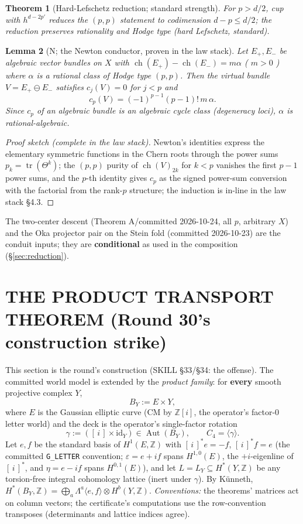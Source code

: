 \documentclass[11pt]{article}
\newcommand{\ch}{\operatorname{ch}}
\newcommand{\tr}{\operatorname{tr}}
\newcommand{\Z}{\mathbb Z}
\newtheorem{theorem}{Theorem}[section]
\newtheorem{lemma}[theorem]{Lemma}
\begin{document}
\begin{theorem}[Hard-Lefschetz reduction; standard strength]
For $p>d/2$, cup with $h^{d-2p'}$ reduces the $(p,p)$ statement to
codimension $d-p\le d/2$; the reduction preserves rationality and Hodge
type (hard Lefschetz, standard).
\end{theorem}

\begin{lemma}[N; the Newton conductor, proven in the law stack]\label{lem:N}
Let $E_+,E_-$ be algebraic vector bundles on $X$ with
$\ch(E_+)-\ch(E_-)=m\alpha$ ( $m>0$ ) where $\alpha$ is a rational class of
Hodge type $(p,p)$. Then the virtual bundle $V=E_+\ominus E_-$ satisfies
$c_j(V)=0$ for $j<p$ and
\[
c_p(V)=(-1)^{p-1}(p-1)!\,m\,\alpha .
\]
Since $c_p$ of an algebraic bundle is an algebraic cycle class
(degeneracy loci), $\alpha$ is rational-algebraic.
\end{lemma}

\begin{proof}[Proof sketch (complete in the law stack)]
Newton's identities express the elementary symmetric functions in the
Chern roots through the power sums $p_k=\tr(\Theta^k)$; the $(p,p)$ purity
of $\ch(V)_{2k}$ for $k<p$ vanishes the first $p-1$ power sums, and the
$p$-th identity gives $c_p$ as the signed power-sum conversion with the
factorial from the rank-$p$ structure; the induction is in-line in the law
stack \S4.3.
\end{proof}

The two-center descent (Theorem A/committed 2026-10-24, all $p$, arbitrary
$X$) and the Oka projector pair on the Stein fold (committed 2026-10-23)
are the conduit inputs; they are \textbf{conditional} as used in the
composition (\S\ref{sec:reduction}).

\section{THE PRODUCT TRANSPORT THEOREM (Round 30's construction strike)}
\label{sec:transport}

This section is the round's construction (SKILL §33/§34: the offense). The
committed world model is extended by the \emph{product family}: for
\textbf{every} smooth projective complex $Y$,
\[
B_Y:=E\times Y,
\]
where $E$ is the Gaussian elliptic curve (CM by $\Z[i]$, the operator's
factor-0 letter world) and the deck is the operator's single-factor
rotation
\[
\gamma:=([\,i\,]\times\mathrm{id}_Y)\in\operatorname{Aut}(B_Y),\qquad
C_4=\langle\gamma\rangle .
\]
Let $e,f$ be the standard basis of $H^1(E,\Z)$ with
$[\,i\,]^\ast e=-f$, $[\,i\,]^\ast f=e$ (the committed \texttt{G\_LETTER}
convention; $\varepsilon=e+if$ spans $H^{1,0}(E)$, the $+i$-eigenline of
$[\,i\,]^\ast$, and $\eta=e-if$ spans $H^{0,1}(E)$), and let
$L=L_Y\subseteq H^\ast(Y,\Z)$ be any torsion-free integral cohomology
lattice (inert under $\gamma$). By Künneth,
$H^\ast(B_Y,\Z)=\bigoplus_a\Lambda^a\langle e,f\rangle\otimes H^{b}(Y,\Z)$.
\emph{Conventions:} the theorems' matrices act on column vectors; the
certificate's computations use the row-convention transposes (determinants
and lattice indices agree).
\end{document}
